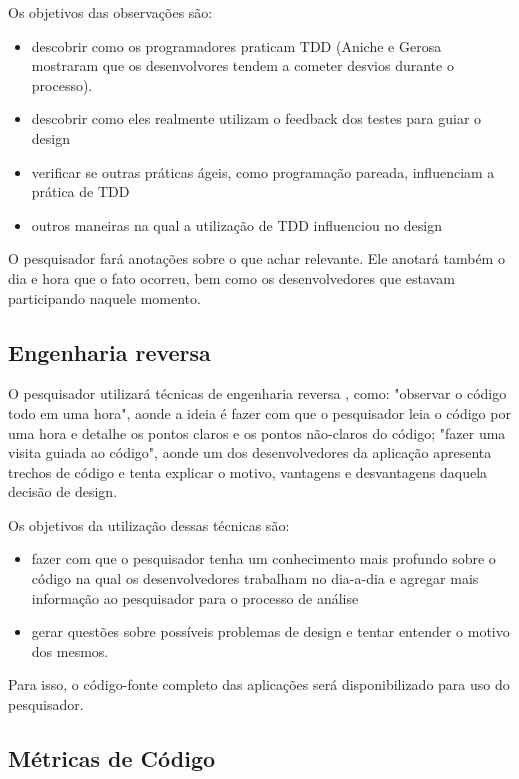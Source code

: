 Os objetivos das observações são:

\begin{itemize}
	\item descobrir como os programadores praticam TDD (Aniche e Gerosa \cite{aniche-mistakes} mostraram que os desenvolvores tendem a cometer desvios durante o processo).
	\item descobrir como eles realmente utilizam o feedback dos testes para guiar o design
	\item verificar se outras práticas ágeis, como programação pareada, influenciam a prática de TDD
	\item outros maneiras na qual a utilização de TDD influenciou no design
\end{itemize}

O pesquisador fará anotações sobre o que achar relevante. Ele anotará também o dia e hora que o fato ocorreu, bem como os desenvolvedores
que estavam participando naquele momento.

\subsection{Engenharia reversa}
\label{sec:planejamento-estrategia-engenharia-reversa}

O pesquisador utilizará técnicas de engenharia reversa \cite{eng-reversa}, como: "observar o código todo em uma hora",
aonde a ideia é fazer com que o pesquisador leia o código por uma hora e detalhe os pontos claros e os pontos não-claros do código; 
"fazer uma visita guiada ao código", aonde um dos desenvolvedores da aplicação apresenta trechos de código e tenta 
explicar o motivo, vantagens e desvantagens daquela decisão de design.

Os objetivos da utilização dessas técnicas são:

\begin{itemize}
	\item fazer com que o pesquisador tenha um conhecimento mais profundo sobre o código na qual os desenvolvedores trabalham no dia-a-dia e agregar mais informação ao pesquisador para o processo de análise
	\item gerar questões sobre possíveis problemas de design e tentar entender o motivo dos mesmos.
\end{itemize}

Para isso, o código-fonte completo das aplicações será disponibilizado para uso do pesquisador.

\subsection{Métricas de Código}
\label{sec:planejamento-estrategia-metricas}

